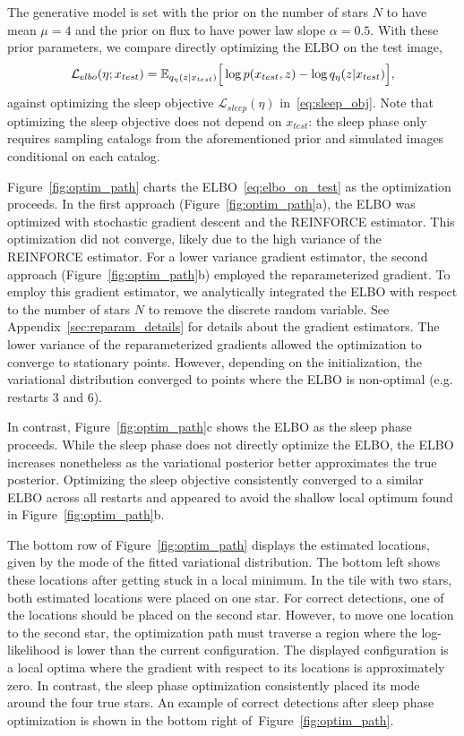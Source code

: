 The generative model is set with the prior on the number of stars $N$ to have mean $\mu = 4$ and the prior on flux to have power law slope $\alpha = 0.5$. 
With these prior parameters, we compare directly optimizing the ELBO on the test image, 
\begin{align}
\mathcal{L}_{elbo}(\eta; x_{test}) = \mathbb{E}_{q_{\eta}(z | x_{test})}\Big[\log p(x_{test}, z) - \log q_{\eta}(z | x_{test})\Big],
\label{eq:elbo_on_test}
\end{align}
against optimizing the sleep objective $\mathcal{L}_{sleep}(\eta)$ in~\eqref{eq:sleep_obj}. Note that optimizing the sleep objective does not depend on $x_{test}$: the sleep phase only requires sampling catalogs from the aforementioned prior and simulated images conditional on each catalog. 

Figure~\ref{fig:optim_path} charts the ELBO~\eqref{eq:elbo_on_test} as the optimization proceeds.
In the first approach (Figure~\ref{fig:optim_path}a), the ELBO was optimized with stochastic gradient descent and the REINFORCE estimator.
This optimization did not converge, likely due to the high variance of the REINFORCE estimator. 
For a lower variance gradient estimator, the second approach (Figure~\ref{fig:optim_path}b) employed the reparameterized gradient.  To employ this gradient estimator, we analytically integrated the ELBO with respect to the number of stars $N$ to remove the discrete random variable. 
See Appendix~\ref{sec:reparam_details} for details about the gradient estimators. 
The lower variance of the reparameterized gradients allowed the optimization to converge to stationary points. 
However, depending on the initialization, the variational distribution converged to points where the ELBO is non-optimal (e.g. restarts 3 and 6). 

In contrast, Figure~\ref{fig:optim_path}c shows the ELBO as the sleep phase proceeds. 
While the sleep phase does not directly optimize the ELBO, the ELBO increases nonetheless as the variational posterior better approximates the true posterior. 
Optimizing the sleep objective consistently converged to a similar ELBO across all restarts and appeared to avoid the shallow local optimum found in Figure~\ref{fig:optim_path}b.

The bottom row of Figure~\ref{fig:optim_path} displays the estimated locations, given by the mode of the fitted variational distribution. 
The bottom left shows these locations after getting stuck in a local minimum. 
In the tile with two stars, both estimated locations were placed on one star. 
For correct detections, one of the locations should be placed on the second star. 
However, to move one location to the second star, the optimization path must traverse a region where the log-likelihood is lower than the current configuration. 
The displayed configuration is a local optima where the gradient with respect to its locations is approximately zero.
In contrast, the sleep phase optimization consistently placed its mode around the four true stars. 
An example of correct detections after sleep phase optimization is shown in the bottom right of~Figure~\ref{fig:optim_path}.

